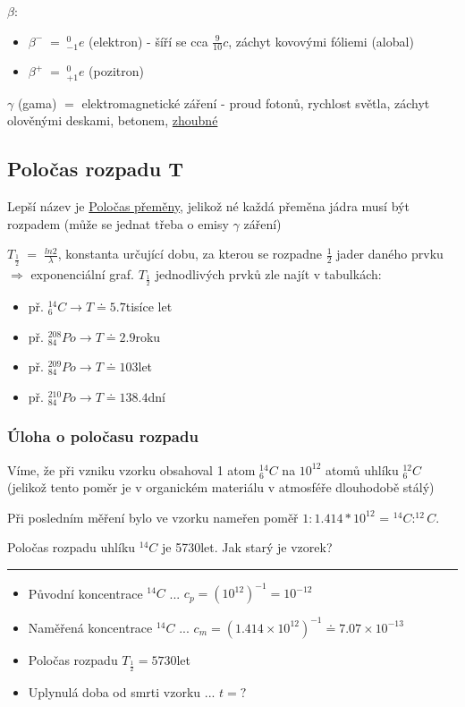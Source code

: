 $\beta$: \begin{itemize}
    \item $\beta^{-} \; = \; ^0_{-1}e$ (elektron) - šíří se cca $\frac{9}{10}c$, záchyt kovovými fóliemi (alobal)
    \item $\beta^{+} \; = \; ^0_{+1}e$ (pozitron)
\end{itemize}

\vspace{2em}

$\gamma$ (gama) $=$ elektromagnetické záření - proud fotonů, rychlost světla, záchyt olověnými deskami, betonem, \underline{zhoubné}

\subsection{Poločas rozpadu T}
Lepší název je \underline{Poločas přeměny}, jelikož né každá přeměna jádra musí být rozpadem (může se jednat třeba o emisy $\gamma$ záření)

$T_{\frac{1}{2}} \; = \; \frac{ln2}{\lambda}$, konstanta určující dobu, za kterou se rozpadne $\frac{1}{2}$ jader daného prvku $\Rightarrow$ exponenciální graf.
\textbf{$T_{\frac{1}{2}}$} jednodlivých prvků zle najít v tabulkách: 
\begin{itemize}
    \item př. $^{14}_6C \rightarrow T \doteq 5.7$tisíce let
    \item př. $^{208}_{84}Po \rightarrow T \doteq 2.9$roku
    \item př. $^{209}_{84}Po \rightarrow T \doteq 103$let
    \item př. $^{210}_{84}Po \rightarrow T \doteq 138.4$dní
\end{itemize}

\newpage
\subsubsection{Úloha o poločasu rozpadu}

Víme, že při vzniku vzorku obsahoval 1 atom $^{14}_6C$ na $10^{12}$ atomů uhlíku $^{12}_6C$ (jelikož tento poměr je v organickém materiálu v atmosféře dlouhodobě stálý)

Při posledním měření bylo ve vzorku nameřen poměř $1 : 1.414*10^{12}$ = $^{14}C : ^{12}C$.

Poločas rozpadu uhlíku $^{14}C$ je 5730let. Jak starý je vzorek?

\rule{5em}{1px}

\begin{itemize}
    \item Původní koncentrace $^{14}C$ ... $c_p = (10^{12})^{-1} = 10^{-12}$
    \item Naměřená koncentrace $^{14}C$ ... $c_m = (1.414 \times 10^{12})^{-1} \doteq 7.07 \times 10^{-13}$
    \item Poločas rozpadu $T_{\frac{1}{2}} = 5730$let
    \item Uplynulá doba od smrti vzorku ... $t = ?$
\end{itemize}

